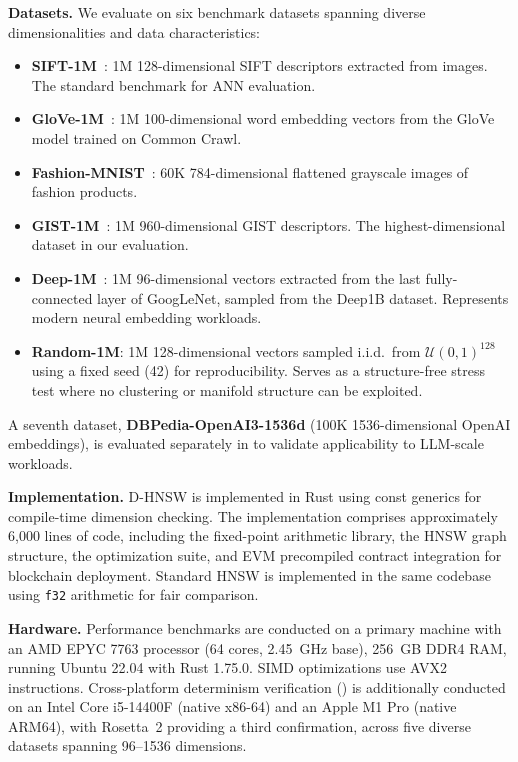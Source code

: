 \documentclass[10pt,journal]{IEEEtran}
\newcommand{\dhnsw}{\textsc{D-HNSW}}
\newcommand{\hnsw}{\textsc{HNSW}}
\begin{document}
\textbf{Datasets.} We evaluate on six benchmark datasets spanning diverse dimensionalities and data characteristics:

\begin{itemize}[leftmargin=*]
  \item \textbf{SIFT-1M}~\cite{jegou2011pq}: 1M 128-dimensional SIFT descriptors extracted from images. The standard benchmark for ANN evaluation.
  \item \textbf{GloVe-1M}~\cite{pennington2014glove}: 1M 100-dimensional word embedding vectors from the GloVe model trained on Common Crawl.
  \item \textbf{Fashion-MNIST}~\cite{xiao2017fashion}: 60K 784-dimensional flattened grayscale images of fashion products.
  \item \textbf{GIST-1M}~\cite{oliva2001gist}: 1M 960-dimensional GIST descriptors. The highest-dimensional dataset in our evaluation.
  \item \textbf{Deep-1M}~\cite{babenko2016deep1b}: 1M 96-dimensional vectors extracted from the last fully-connected layer of GoogLeNet, sampled from the Deep1B dataset. Represents modern neural embedding workloads.
  \item \textbf{Random-1M}: 1M 128-dimensional vectors sampled i.i.d.\ from $\mathcal{U}(0,1)^{128}$ using a fixed seed (42) for reproducibility. Serves as a structure-free stress test where no clustering or manifold structure can be exploited.
\end{itemize}

\noindent A seventh dataset, \textbf{DBPedia-OpenAI3-1536d} (100K 1536-dimensional OpenAI embeddings), is evaluated separately in  to validate applicability to LLM-scale workloads.

\textbf{Implementation.} \dhnsw{} is implemented in Rust using const generics for compile-time dimension checking. The implementation comprises approximately 6{,}000 lines of code, including the fixed-point arithmetic library, the \hnsw{} graph structure, the optimization suite, and EVM precompiled contract integration for blockchain deployment. Standard \hnsw{} is implemented in the same codebase using \texttt{f32} arithmetic for fair comparison.

\textbf{Hardware.} Performance benchmarks are conducted on a primary machine with an AMD EPYC 7763 processor (64 cores, 2.45~GHz base), 256~GB DDR4 RAM, running Ubuntu 22.04 with Rust 1.75.0. SIMD optimizations use AVX2 instructions. Cross-platform determinism verification () is additionally conducted on an Intel Core i5-14400F (native x86-64) and an Apple M1 Pro (native ARM64), with Rosetta~2 providing a third confirmation, across five diverse datasets spanning 96--1536 dimensions.
\end{document}
